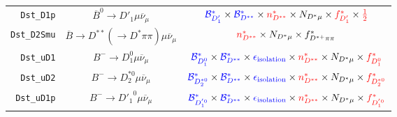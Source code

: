\begin{landscape}
\begin{table}
\begin{tabular}{r|c|c}
     \texttt{Dst\_D1p} &             $\overline{B}^0 \rightarrow D'_1 \mu \overline{\nu}_\mu$              &                                                                                          $\textcolor{blue}{\mathcal{B}^{*}_{D'_1}} \times \textcolor{blue}{\mathcal{B}^*_{D^{**}}} \times \textcolor{red}{n^{*}_{D^{**}}} \times N_{D^* \mu} \times \textcolor{red}{f^{*}_{D'_1}} \times \textcolor{red}{\frac{1}{2}}$                                                                                          \\
   \texttt{Dst\_D2Smu} & $\overline{B} \rightarrow D^{**} (\rightarrow D^* \pi\pi) \mu \overline{\nu}_\mu$ &                                                                                                                                                                 $\textcolor{red}{n^{*}_{D^{**}}} \times N_{D^* \mu} \times f^*_{D^{*+}\pi\pi}$                                                                                                                                                                  \\
     \texttt{Dst\_uD1} &                  $B^- \rightarrow D_1^0 \mu \overline{\nu}_\mu$                   &                                                                                 $\textcolor{blue}{\mathcal{B}^{*}_{D_1^0}} \times \textcolor{blue}{\mathcal{B}^*_{D^{**}}} \times \textcolor{blue}{\epsilon_\text{isolation}} \times \textcolor{red}{n^{*}_{D^{**}}} \times N_{D^* \mu} \times \textcolor{red}{f^{*}_{D_1^0}}$                                                                                  \\
     \texttt{Dst\_uD2} &                 $B^- \rightarrow D_2^{*0} \mu \overline{\nu}_\mu$                 &                                                                              $\textcolor{blue}{\mathcal{B}^{*}_{D_2^{*0}}} \times \textcolor{blue}{\mathcal{B}^*_{D^{**}}} \times \textcolor{blue}{\epsilon_\text{isolation}} \times \textcolor{red}{n^{*}_{D^{**}}} \times N_{D^* \mu} \times \textcolor{red}{f^{*}_{D_2^{*0}}}$                                                                               \\
    \texttt{Dst\_uD1p} &                 $B^- \rightarrow {D'_1}^0 \mu \overline{\nu}_\mu$                 &                                                                              $\textcolor{blue}{\mathcal{B}^{*}_{D_1^{'0}}} \times \textcolor{blue}{\mathcal{B}^*_{D^{**}}} \times \textcolor{blue}{\epsilon_\text{isolation}} \times \textcolor{red}{n^{*}_{D^{**}}} \times N_{D^* \mu} \times \textcolor{red}{f^{*}_{D_1^{'0}}}$                                                                               \\

\end{tabular}
\end{table}
\end{landscape}

